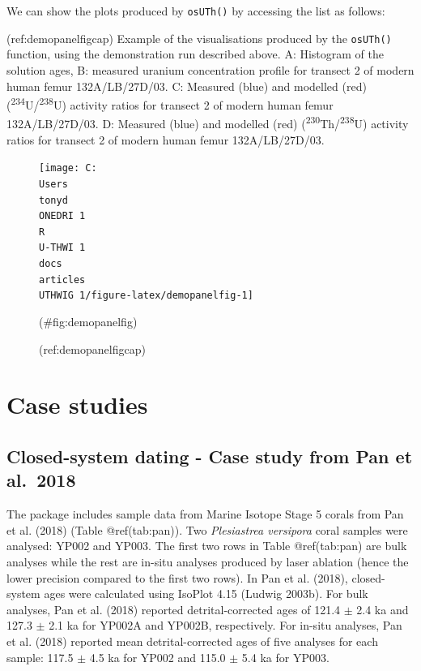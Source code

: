 \documentclass[]{elsarticle} %
\newenvironment{Shaded}{\begin{snugshade}}{\end{snugshade}}
\newcommand{\NormalTok}[1]{#1}
\newcommand{\OperatorTok}[1]{\textcolor[rgb]{0.81,0.36,0.00}{\textbf{#1}}}
\begin{document}
We can show the plots produced by \texttt{osUTh()} by accessing the list as follows:

(ref:demopanelfigcap) Example of the visualisations produced by the \texttt{osUTh()} function, using the demonstration run described above. A: Histogram of the solution ages, B: measured uranium concentration profile for transect 2 of modern human femur 132A/LB/27D/03. C: Measured (blue) and modelled (red) (\textsuperscript{234}U/\textsuperscript{238}U) activity ratios for transect 2 of modern human femur 132A/LB/27D/03. D: Measured (blue) and modelled (red) (\textsuperscript{230}Th/\textsuperscript{238}U) activity ratios for transect 2 of modern human femur 132A/LB/27D/03.

\begin{Shaded}
\end{Shaded}

\begin{figure}
\texttt{[image: C:\\Users\\tonyd\\ONEDRI~1\\R\\U-THWI~1\\docs\\articles\\UTHWIG~1/figure-latex/demopanelfig-1]} \caption{(ref:demopanelfigcap)}(\#fig:demopanelfig)
\end{figure}

\FloatBarrier

\newpage

\hypertarget{case-studies}{%
\section{Case studies}\label{case-studies}}

\hypertarget{closed-system-dating---case-study-from-pan-et-al.-2018}{%
\subsection{Closed-system dating - Case study from Pan et al.~2018}\label{closed-system-dating---case-study-from-pan-et-al.-2018}}

The package includes sample data from Marine Isotope Stage 5 corals from Pan et al. (2018) (Table @ref(tab:pan)). Two \emph{Plesiastrea versipora} coral samples were analysed: YP002 and YP003. The first two rows in Table @ref(tab:pan) are bulk analyses while the rest are in-situ analyses produced by laser ablation (hence the lower precision compared to the first two rows).
In Pan et al. (2018), closed-system ages were calculated using IsoPlot 4.15 (Ludwig 2003b). For bulk analyses, Pan et al. (2018) reported detrital-corrected ages of 121.4 \(\pm\) 2.4 ka and 127.3 \(\pm\) 2.1 ka for YP002A and YP002B, respectively. For in-situ analyses, Pan et al. (2018) reported mean detrital-corrected ages of five analyses for each sample: 117.5 \(\pm\) 4.5 ka for YP002 and 115.0 \(\pm\) 5.4 ka for YP003.
\end{document}
